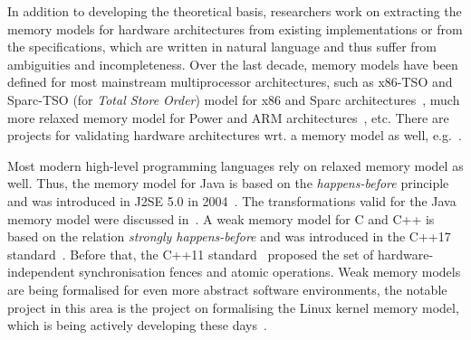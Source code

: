 In addition to developing the theoretical basis, researchers work on extracting the memory models for hardware architectures from existing implementations or from the specifications, which are written in natural language and thus suffer from ambiguities and incompleteness.
Over the last decade, memory models have been defined for most mainstream multiprocessor architectures, such as x86-TSO and Sparc-TSO (for \textit{Total Store Order}) model for x86 and Sparc architectures~\cite{owens2009better}, much more relaxed memory model for Power and ARM architectures~\cite{alglave2009semantics,sarkar2011understanding, alglave2014herding}, etc. %
There are projects for validating hardware architectures wrt. a memory model as well, e.g.~\cite{lustig2014pipecheck,lustig2016coatcheck}.


Most modern high-level programming languages rely on relaxed memory model as well.
Thus, the memory model for Java is based on the \textit{happens-before} principle~\cite{lamport1978time} and was introduced in J2SE 5.0 in 2004~\cite{manson2005java}.
The transformations valid for the Java memory model were discussed in~\cite{sevcik2009program}. 
A weak memory model for C and C++ is based on the relation \textit{strongly happens-before} and was introduced in the C++17 standard~\cite{batty2011mathematizing}.
Before that, the C++11 standard~\cite{iso2012iec} proposed the set of hardware-independent synchronisation fences and atomic operations.
Weak memory models are being formalised for even more abstract software environments, the notable project in this area is the project on formalising the Linux kernel memory model, which is being actively developing these days~\cite{alglave2018frightening, kernel1}.

